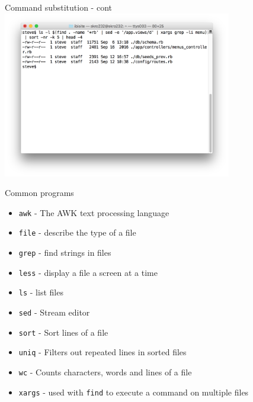 \documentclass[t]{beamer}
\begin{document}
\begin{frame}{Command substitution - cont}
  \includegraphics[width=10cm,scale=0.4]{images/cs-2.png}
  \note{}
\end{frame}

\begin{frame}{Common programs}
  \begin{itemize}
  \item \texttt{awk} - The AWK text processing language
    \pause
  \item \texttt{file} - describe the type of a file
    \pause
  \item \texttt{grep} - find strings in files
    \pause
  \item \texttt{less} - display a file a screen at a time
    \pause
  \item \texttt{ls} - list files
    \pause
  \item \texttt{sed} - Stream editor
    \pause
  \item \texttt{sort} - Sort lines of a file
    \pause
  \item \texttt{uniq} - Filters out repeated lines in sorted files
    \pause
  \item \texttt{wc} - Counts characters, words and lines of a file
    \pause
  \item \texttt{xargs} - used with \texttt{find} to execute a command on
    multiple files
  \end{itemize}
  \note{}
\end{frame}
\end{document}
